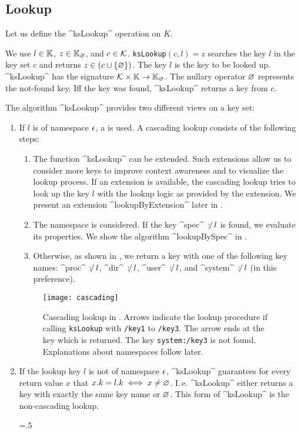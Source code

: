 \subsection{Lookup}
\label{sec:approach-lookup}

Let us define the ^ksLookup^ operation on $K$.

\begin{definition}
We use $l \in \mathbb{K}$, $z \in \mathbb{K}_\varnothing$, and $c \in \mathcal{K}$.
\texttt{ksLookup}$(c, l) = z$ searches the key $l$ in the key set $c$ and returns $z \in (c \cup \{\varnothing\})$.
The key $l$ is the key to be looked up.
^ksLookup^ has the signature $\mathcal{K} \times \mathbb{K} \to \mathbb{K}_\varnothing$.
The nullary operator $\varnothing$ represents the not-found key.
Iff the key was found, ^ksLookup^ returns a key from $c$.
\end{definition}

The algorithm ^ksLookup^ provides two different views on a key set:
\begin{enumerate}
\item If $l$ is of namespace $\epsilon$, a  is used.
A cascading lookup consists of the following steps:
\begin{enumerate}
\item
The function ^ksLookup^ can be extended.
Such extensions allow us to consider more keys to improve context awareness and to visualize the lookup process.
If an extension is available, the cascading lookup tries to look up the key $l$ with the lookup logic as provided by the extension.
We present an extension ^lookupByExtension^ later in .
\item
The namespace  is considered.
If the key ^spec^ $\operatorname*{\mathnormal{\colon\!\!\!/}} l$ is found, we evaluate its properties.
We show the algorithm ^lookupBySpec^ in .

\item
Otherwise, as shown in , we return a key with one of the following key names:
^proc^ $\operatorname*{\mathnormal{\colon\!\!\!/}} l$, ^dir^ $\operatorname*{\mathnormal{\colon\!\!\!/}} l$, ^user^ $\operatorname*{\mathnormal{\colon\!\!\!/}} l$, and ^system^ $\operatorname*{\mathnormal{\colon\!\!\!/}} l$ (in this preference).
\end{enumerate}

\begin{figure}[htp]
\centering
\texttt{[image: cascading]}
\caption[Cascading Lookup.]{Cascading lookup in \elektra{}.
Arrows indicate the lookup procedure if calling \texttt{ksLookup} with \texttt{/key1} to \texttt{/key3}.
The arrow ends at the key which is returned.
The key \texttt{system:/key3} is not found.
Explanations about namespaces follow later.
}
\label{fig:cascading}
\end{figure}

\item If the lookup key $l$ is not of namespace $\epsilon$, ^ksLookup^ guarantees for every return value $x$ that $x.k = l.k \iff x \neq \varnothing$.
I.\,e. ^ksLookup^ either returns a key with exactly the same key name or $\varnothing$.
This form of ^ksLookup^ is the non-cascading lookup.%
{\parfillskip=0pt \emergencystretch=.5\textwidth \par}
\end{enumerate}

